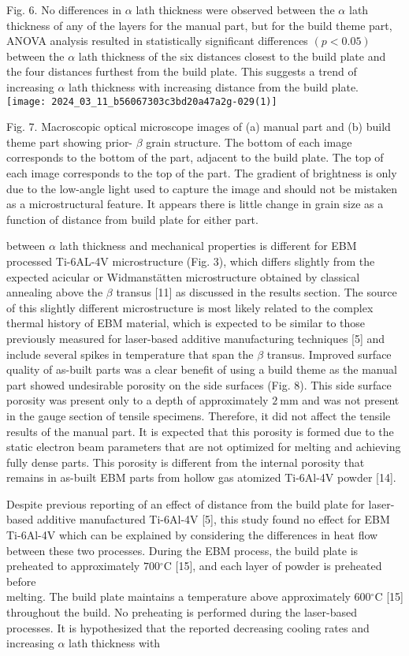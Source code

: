 \documentclass[10pt]{article}
\begin{document}
Fig. 6. No differences in $\alpha$ lath thickness were observed between the $\alpha$ lath thickness of any of the layers for the manual part, but for the build theme part, ANOVA analysis resulted in statistically significant differences $(p<0.05)$ between the $\alpha$ lath thickness of the six distances closest to the build plate and the four distances furthest from the build plate. This suggests a trend of increasing $\alpha$ lath thickness with increasing distance from the build plate.\\
\texttt{[image: 2024\_03\_11\_b56067303c3bd20a47a2g-029(1)]}

Fig. 7. Macroscopic optical microscope images of (a) manual part and (b) build theme part showing prior- $\beta$ grain structure. The bottom of each image corresponds to the bottom of the part, adjacent to the build plate. The top of each image corresponds to the top of the part. The gradient of brightness is only due to the low-angle light used to capture the image and should not be mistaken as a microstructural feature. It appears there is little change in grain size as a function of distance from build plate for either part.

between $\alpha$ lath thickness and mechanical properties is different for EBM processed Ti-6AL-4V microstructure (Fig. 3), which differs slightly from the expected acicular or Widmanstätten microstructure obtained by classical annealing above the $\beta$ transus [11] as discussed in the results section. The source of this slightly different microstructure is most likely related to the complex thermal history of EBM material, which is expected to be similar to those previously measured for laser-based additive manufacturing techniques [5] and include several spikes in temperature that span the $\beta$ transus. Improved surface quality of as-built parts was a clear benefit of using a build theme as the manual part showed undesirable porosity on the side surfaces (Fig. 8). This side surface porosity was present only to a depth of approximately $2 \mathrm{~mm}$ and was not present in the gauge section of tensile specimens. Therefore, it did not affect the tensile results of the manual part. It is expected that this porosity is formed due to the static electron beam parameters that are not optimized for melting and achieving fully dense parts. This porosity is different from the internal porosity that remains in as-built EBM parts from hollow gas atomized Ti-6Al-4V powder [14].

Despite previous reporting of an effect of distance from the build plate for laser-based additive manufactured Ti-6Al-4V [5], this study found no effect for EBM Ti-6Al-4V which can be explained by considering the differences in heat flow between these two processes. During the EBM process, the build plate is preheated to approximately $700{ }^{\circ} \mathrm{C}$ [15], and each layer of powder is preheated before\\
melting. The build plate maintains a temperature above approximately $600{ }^{\circ} \mathrm{C}$ [15] throughout the build. No preheating is performed during the laser-based processes. It is hypothesized that the reported decreasing cooling rates and increasing $\alpha$ lath thickness with
\end{document}
